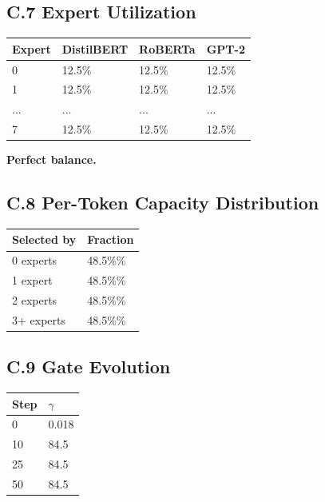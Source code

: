 \subsection{C.7 Expert Utilization}

\begin{table}[H]
\centering
\small
\begin{tabular}{llll}
\toprule
\textbf{Expert} & \textbf{DistilBERT} & \textbf{RoBERTa} & \textbf{GPT-2} \\
\midrule
0 & 12.5\% & 12.5\% & 12.5\% \\
1 & 12.5\% & 12.5\% & 12.5\% \\
... & ... & ... & ... \\
7 & 12.5\% & 12.5\% & 12.5\% \\
\bottomrule
\end{tabular}
\end{table}

\textbf{Perfect balance.}

\subsection{C.8 Per-Token Capacity Distribution}

\begin{table}[H]
\centering
\small
\begin{tabular}{ll}
\toprule
\textbf{Selected by} & \textbf{Fraction} \\
\midrule
0 experts & 48.5\%\% \\
1 expert & 48.5\%\% \\
2 experts & 48.5\%\% \\
3+ experts & 48.5\%\% \\
\bottomrule
\end{tabular}
\end{table}

\subsection{C.9 Gate Evolution}

\begin{table}[H]
\centering
\small
\begin{tabular}{ll}
\toprule
\textbf{Step} & \textbf{$\gamma$} \\
\midrule
0 & 0.018 \\
10 & 84.5 \\
25 & 84.5 \\
50 & 84.5 \\
\bottomrule
\end{tabular}
\end{table}

